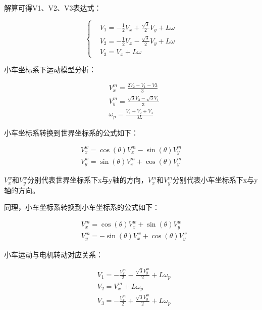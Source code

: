 解算可得V1、V2、V3表达式：

\begin{equation}
    \left\{\begin{aligned}
    &V_{1}=-\frac{1}{2} V_{x}+\frac{\sqrt{3}}{2} V_{y}+L \omega \\
    &V_{2}=-\frac{1}{2} V_{x}-\frac{\sqrt{3}}{2} V_{y}+L \omega \\
    &V_{3}=V_{x}+L \omega
    \end{aligned}\right.
\end{equation}

小车坐标系下运动模型分析：

\begin{equation}
    \begin{aligned}
    &V_{x}^{m}=\frac{2 V_{2}-V_{1}-V 3}{3}\\
    &V_{y}^{m}=\frac{\sqrt{3} V_{3}-\sqrt{3} V_{1}}{3}\\
    &\omega_{p}=\frac{V_{1}+V_{2}+V_{3}}{3 L}
    \end{aligned}
\end{equation}

小车坐标系转换到世界坐标系的公式如下：

\begin{equation}
    \begin{array}{l}
    {V_{x}^{w}=\cos (\theta) V_{x}^{m}-\sin (\theta) V_{y}^{m}} \\
    {V_{y}^{w}=\sin (\theta) V_{x}^{m}+\cos (\theta) V_{y}^{m}}
    \end{array}
\end{equation}

$V_{x}^{w}$和$V_{y}^{w}$分别代表世界坐标系下x与y轴的方向，$V_{x}^{m}$和$V_{y}^{m}$分别代表小车坐标系下x与y轴的方向。

同理，小车坐标系转换到小车坐标系的公式如下：

\begin{equation}
    \begin{aligned}
    &V_{x}^{m}=\cos (\theta) V_{x}^{w}+\sin (\theta) V_{y}^{w}\\
    &V_{y}^{m}=-\sin (\theta) V_{x}^{w}+\cos (\theta) V_{y}^{w}
    \end{aligned}
\end{equation}

小车运动与电机转动对应关系：

\begin{equation}
    \begin{aligned}
    &V_{1}=-\frac{V_{x}^{m}}{2}-\frac{\sqrt{3} V_{y}^{m}}{2}+L \omega_{p}\\
    &V_{2}=V_{x}^{m}+L \omega_{p}\\
    &V_{3}=-\frac{V_{x}^{m}}{2}+\frac{\sqrt{3} V_{y}^{m}}{2}+L \omega_{p}
    \end{aligned}
\end{equation}

